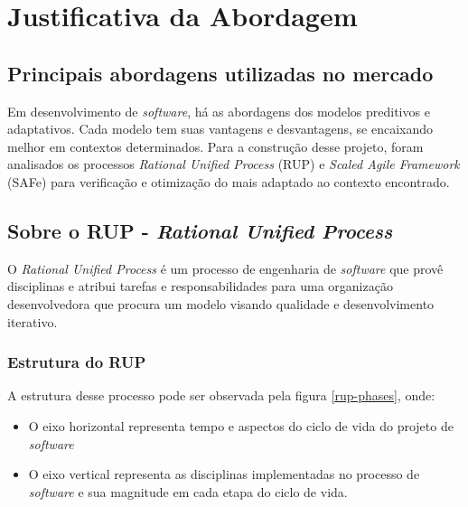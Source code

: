 \chapter{Justificativa da Abordagem}
\label{justify}

\section{Principais abordagens utilizadas no mercado}

Em desenvolvimento de \textit{software}, há as abordagens dos modelos preditivos e adaptativos. Cada modelo tem suas vantagens e desvantagens, se encaixando melhor em contextos determinados. Para a construção desse projeto, foram analisados os processos \textit{Rational Unified Process} (RUP) e \textit{Scaled Agile Framework} (SAFe) para verificação e otimização do mais adaptado ao contexto encontrado.

\section{Sobre o RUP - \textit{Rational Unified Process}}

O \textit{Rational Unified Process} é um processo de engenharia de \textit{software} que provê disciplinas e atribui tarefas e responsabilidades para uma organização desenvolvedora que procura um modelo visando qualidade e desenvolvimento iterativo.~\cite{kruchten}

\subsection{Estrutura do RUP}

A estrutura desse processo pode ser observada pela figura \ref{rup-phases}, onde:

\begin{itemize}
\item O eixo horizontal representa tempo e aspectos do ciclo de vida do projeto de \textit{software}
\item O eixo vertical representa as disciplinas implementadas no processo de \textit{software} e sua magnitude em cada etapa do ciclo de vida.
\end{itemize}

